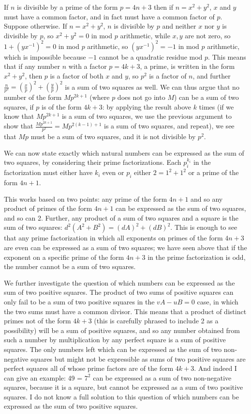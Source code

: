 \documentclass[12pt]{article}
\begin{document}
If $n$ is divisible by a prime of the form $p=4n+3$  then if $n=x^2+y^2$, $x$ and $y$ must have a common factor, and in fact must have a common factor of $p$.  Suppose otherwise.  If $n=x^2+y^2$, $n$ is divisible by $p$
and neither $x$ nor $y$ is divisible by $p$, so $x^2+y^2 = 0$ in mod $p$ arithmetic, while $x, y$ are not zero, so $1+(yx^{-1})^2=0$ in mod $p$ arithmetic, so
$(yx^{-1})^2=-1$ in mod $p$ arithmetic, which is impossible because $-1$ cannot be a quadratic residue mod $p$.    This means that if any number $n$ with a factor $p=4k+3$, a prime,
is written in the form $x^2+y^2$, then $p$ is a factor of both $x$ and $y$, so $p^2$ is a factor of $n$, and further $\frac{n}{p^2}=(\frac xp)^2 + (\frac yp)^2$ is a sum of two squares as well.  We can thus argue that no number of the form $Mp^{2k+1}$ (where $p$ does not go into $M$)  can be a sum of two squares, if $p$ is of the form $4k+3$: by applying the result above $k$ times (if we know that $Mp^{2k+1}$ is a sum of two squares, we use the previous argument to show that $\frac{Mp^{2k+1}}{p^2}=Mp^{2(k-1)+1}$ is a sum of two squares, and repeat), we see that $Mp$ must be a sum of two squares, and it is not divisible by $p^2$.

We can now state exactly which natural numbers can be expressed as the sum of two squares, by considering their prime factorizations.   Each $p_i^{k_i}$ in the factorization must either have
$k_i$ even or $p_i$ either $2 = 1^2+1^2$ or a prime of the form $4n+1$.

This works based on two points:  any prime of the form $4n+1$ and so any product of primes of the form $4n+1$ can be expressed as the sum of two squares, and so can 2.  Further, any product of a sum of two squares
and a square is the sum of two squares:  $d^2(A^2+B^2) = (dA)^2+(dB)^2$.   This is enough to see that any prime factorization in which all exponents on  primes of the form $4n+3$ are even
can be expressed as a sum of two squares; we have seen above that if the exponent on a specific prime of the form $4n+3$ in the prime factorization is odd, the number cannot be a sum of two squares.

We further investigate the question of which numbers can be expressed as the sum of two positive squares.  The product of two sums of positive squares can only fail to be a sum of two positive squares in the $vA-uB=0$ case, in which the two sums must have a common divisor.   This means that a product of distinct primes not of the form $4k+3$ (this is carefully phrased to include 2 as a possibility)  will be a sum of positive squares, and so any number obtained from such a number by multiplication by any perfect square is a sum of positive squares.  The only numbers left which can be expressed as the sum of two non-negative squares but might not be expressible as sums of two positive squares are perfect squares all of whose prime
factors are of the form $4k+3$.  And indeed I can give an example:  49 = $7^2$ can be expressed as a sum of two non-negative squares, because it is a square, but cannot be expressed as a sum of two positive squares.  I do not know a full solution to this question of which numbers can be expressed as the sum of two positive squares.
\end{document}
